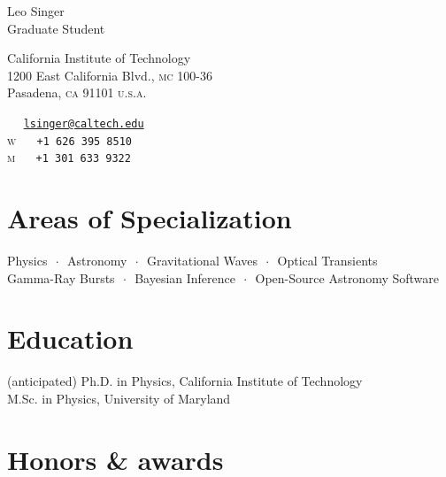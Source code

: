 \documentclass[10pt, letterpaper]{article} %
\newcommand{\listsep}{$\,\cdot\,$}
\newcommand{\years}[1]{\marginnote{\scriptsize #1}} %
\begin{document}

{\LARGE Leo Singer}\\[1cm] %
Graduate Student\\
\begin{minipage}[t][2cm][s]{8cm}
California Institute of Technology\\ %
1200 East California Blvd., \textsc{mc} 100-36\\
Pasadena, \textsc{ca} 91101 \textsc{u.s.a.}\\[.2cm]
\end{minipage}\begin{minipage}[t][2cm][s]{5cm}
{\tiny\faEnvelopeAlt} \,\,\,\,\,\, \href{mailto:lsinger@caltech.edu}{\small \texttt{lsinger@caltech.edu}}\\
\textsc{w} \,\,\,\,\,\, \texttt{\small +1 626 395 8510}\\ %
\textsc{m} \,\,\,\,\,\, \texttt{\small +1 301 633 9322}\\ %
\end{minipage}

\section*{Areas of Specialization}

Physics \listsep{}  Astronomy \listsep{} Gravitational Waves \listsep{} Optical Transients \\
Gamma-Ray Bursts \listsep{}  Bayesian Inference \listsep{} Open-Source Astronomy Software

\section*{Education}

\years{2014}(anticipated) Ph.D. in Physics, California Institute of Technology\\[0.125cm]
%
\years{2009}M.Sc. in Physics, University of Maryland

\section*{Honors \& awards}
\end{document}
